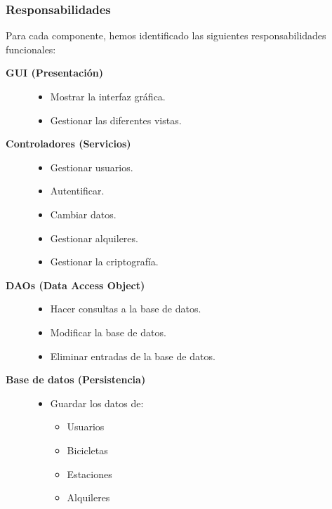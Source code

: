 \documentclass[a4paper,12pt]{article}
\begin{document}
    \subsubsection{Responsabilidades}
    Para cada componente, hemos identificado las siguientes responsabilidades funcionales:
    \begin{description}
        \item[\textbf{GUI (Presentación)}]
        \begin{itemize}
            \item Mostrar la interfaz gráfica.
            \item Gestionar las diferentes vistas.
        \end{itemize}
        \item[\textbf{Controladores (Servicios)}]
        \begin{itemize}
            \item Gestionar usuarios.
            \item Autentificar.
            \item Cambiar datos.
            \item Gestionar alquileres.
            \item Gestionar la criptografía.
        \end{itemize}
        \item[\textbf{DAOs (Data Access Object)}]
        \begin{itemize}
            \item Hacer consultas a la base de datos.
            \item Modificar la base de datos.
            \item Eliminar entradas de la base de datos.
        \end{itemize}
        \item[\textbf{Base de datos (Persistencia)}]
        \begin{itemize}
            \item Guardar los datos de:
            \begin{itemize}
                \item Usuarios
                \item Bicicletas
                \item Estaciones
                \item Alquileres
            \end{itemize}
        \end{itemize}
    \end{description}
\end{document}
